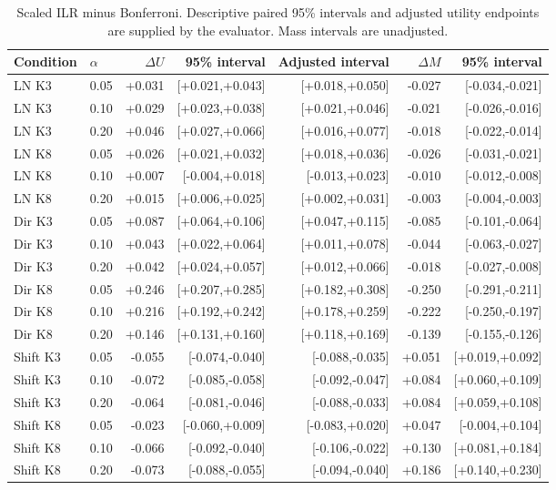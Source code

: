 \documentclass{article}
\begin{document}
\begin{table}[p]
\centering\scriptsize
\caption{Scaled ILR minus Bonferroni. Descriptive paired 95\% intervals and adjusted utility endpoints are supplied by the evaluator. Mass intervals are unadjusted.}
\begin{tabular}{llrrrrr}
\toprule
Condition & $\alpha$ & $\Delta U$ & 95\% interval & Adjusted interval & $\Delta M$ & 95\% interval \\
\midrule
LN K3 & 0.05 & +0.031 & [+0.021,+0.043] & [+0.018,+0.050] & -0.027 & [-0.034,-0.021] \\
LN K3 & 0.10 & +0.029 & [+0.023,+0.038] & [+0.021,+0.046] & -0.021 & [-0.026,-0.016] \\
LN K3 & 0.20 & +0.046 & [+0.027,+0.066] & [+0.016,+0.077] & -0.018 & [-0.022,-0.014] \\
LN K8 & 0.05 & +0.026 & [+0.021,+0.032] & [+0.018,+0.036] & -0.026 & [-0.031,-0.021] \\
LN K8 & 0.10 & +0.007 & [-0.004,+0.018] & [-0.013,+0.023] & -0.010 & [-0.012,-0.008] \\
LN K8 & 0.20 & +0.015 & [+0.006,+0.025] & [+0.002,+0.031] & -0.003 & [-0.004,-0.003] \\
Dir K3 & 0.05 & +0.087 & [+0.064,+0.106] & [+0.047,+0.115] & -0.085 & [-0.101,-0.064] \\
Dir K3 & 0.10 & +0.043 & [+0.022,+0.064] & [+0.011,+0.078] & -0.044 & [-0.063,-0.027] \\
Dir K3 & 0.20 & +0.042 & [+0.024,+0.057] & [+0.012,+0.066] & -0.018 & [-0.027,-0.008] \\
Dir K8 & 0.05 & +0.246 & [+0.207,+0.285] & [+0.182,+0.308] & -0.250 & [-0.291,-0.211] \\
Dir K8 & 0.10 & +0.216 & [+0.192,+0.242] & [+0.178,+0.259] & -0.222 & [-0.250,-0.197] \\
Dir K8 & 0.20 & +0.146 & [+0.131,+0.160] & [+0.118,+0.169] & -0.139 & [-0.155,-0.126] \\
Shift K3 & 0.05 & -0.055 & [-0.074,-0.040] & [-0.088,-0.035] & +0.051 & [+0.019,+0.092] \\
Shift K3 & 0.10 & -0.072 & [-0.085,-0.058] & [-0.092,-0.047] & +0.084 & [+0.060,+0.109] \\
Shift K3 & 0.20 & -0.064 & [-0.081,-0.046] & [-0.088,-0.033] & +0.084 & [+0.059,+0.108] \\
Shift K8 & 0.05 & -0.023 & [-0.060,+0.009] & [-0.083,+0.020] & +0.047 & [-0.004,+0.104] \\
Shift K8 & 0.10 & -0.066 & [-0.092,-0.040] & [-0.106,-0.022] & +0.130 & [+0.081,+0.184] \\
Shift K8 & 0.20 & -0.073 & [-0.088,-0.055] & [-0.094,-0.040] & +0.186 & [+0.140,+0.230] \\
\bottomrule
\end{tabular}
\end{table}
\end{document}
